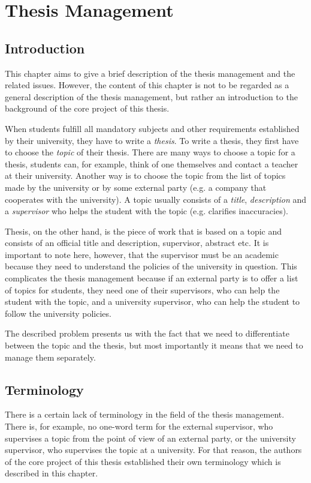 \chapter{Thesis Management}

\section{Introduction}

This chapter aims to give a brief description of the thesis management and the related issues. However, the content of this chapter is not to be regarded as a general description of the thesis management, but rather an introduction to the background of the core project of this thesis.

When students fulfill all mandatory subjects and other requirements established by their university, they have to write a \emph{thesis}. To write a thesis, they first have to choose the \emph{topic} of their thesis. There are many ways to choose a topic for a thesis, students can, for example, think of one themselves and contact a teacher at their university. Another way is to choose the topic from the list of topics made by the university or by some external party (e.g. a company that cooperates with the university). A topic usually consists of a \emph{title}, \emph{description} and a \emph{supervisor} who helps the student with the topic (e.g. clarifies inaccuracies).

Thesis, on the other hand, is the piece of work that is based on a topic and consists of an official title and description, supervisor, abstract etc. It is important to note here, however, that the supervisor must be an academic because they need to understand the policies of the university in question. This complicates the thesis management because if an external party is to offer a list of topics for students, they need one of their supervisors, who can help the student with the topic, and a university supervisor, who can help the student to follow the university policies.

The described problem presents us with the fact that we need to differentiate between the topic and the thesis, but most importantly it means that we need to manage them separately.

\section{Terminology}

There is a certain lack of terminology in the field of the thesis management. There is, for example, no one-word term for the external supervisor, who supervises a topic from the point of view of an external party, or the university supervisor, who supervises the topic at a university. For that reason, the authors of the core project of this thesis established their own terminology which is described in this chapter.

